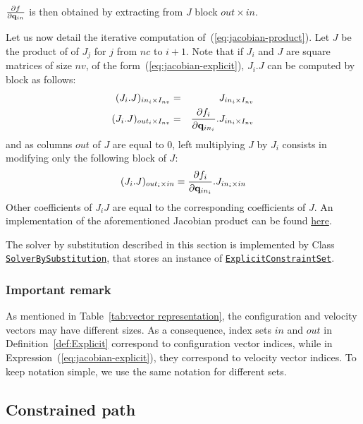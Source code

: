$\frac{\partial f}{\partial\mathbf{q}_{in}}$ is then obtained by extracting from $J$ block $out\times in$.

Let us now detail the iterative computation of~(\ref{eq:jacobian-product}). Let $J$ be the product of of $J_j$ for $j$ from $nc$ to $i+1$.
Note that if $J_i$ and $J$ are square matrices of size $nv$, of the form~(\ref{eq:jacobian-explicit}), $J_i.J$ can be computed by block as follows:
\begin{eqnarray*}
  (J_{i}.J)_{in_{i}\times I_{nv}} &=& J_{in_{i}\times I_{nv}}\\
  (J_{i}.J)_{out_{i}\times I_{nv}} &=& \frac{\partial f_i}{\partial\mathbf{q}_{in_{i}}}.J_{in_{i}\times I_{nv}}\\
\end{eqnarray*}
and as columns $out$ of $J$ are equal to $0$, left multiplying $J$ by $J_i$ consists in modifying only the following block of $J$:
$$
  (J_{i}.J)_{out_{i}\times in} = \frac{\partial f_i}{\partial\mathbf{q}_{in_{i}}}.J_{in_{i}\times {in}}\\
$$
Other coefficients of $J_{i}J$ are equal to the corresponding coefficients of $J$.
An implementation of the aforementioned Jacobian product can be found \href{https://github.com/humanoid-path-planner/hpp-constraints/blob/e21490c8c713949bd3038dccb6fe02cf254a615f/src/explicit-constraint-set.cc\#L267}{here}.

The solver by substitution described in this section is implemented by Class \href{https://gepettoweb.laas.fr/hpp/hpp-constraints/doxygen-html/classhpp_1_1constraints_1_1solver_1_1BySubstitution.html}{\texttt{SolverBySubstitution}}, that stores an instance of \href{https://gepettoweb.laas.fr/hpp/hpp-constraints/doxygen-html/classhpp_1_1constraints_1_1ExplicitConstraintSet.html}{\texttt{ExplicitConstraintSet}}.

\subsubsection{Important remark} As mentioned in Table~\ref{tab:vector representation}, the configuration and velocity vectors may have different sizes. As a consequence, index sets $in$ and $out$ in Definition~\ref{def:Explicit} correspond to configuration vector indices, while in Expression~(\ref{eq:jacobian-explicit}), they correspond to velocity vector indices. To keep notation simple, we use the same notation for different sets.

\subsection{Constrained path}

